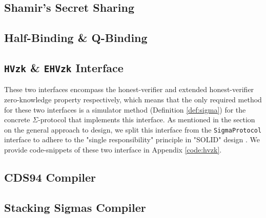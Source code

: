 \subsection{Shamir's Secret Sharing}\label{design:sss}


\subsection{Half-Binding \& Q-Binding}\label{design:qbinding}


\subsection{\texttt{HVzk} \& \texttt{EHVzk} Interface}
These two interfaces encompass the honest-verifier and extended honest-verifier zero-knowledge 
property respectively, which means that the only required method for these two interfaces 
is a simulator method (Definition \ref{def:sigma}) for the concrete $\Sigma$-protocol that 
implements this interface. As mentioned in the section on the general approach to design, 
we split this interface from the \texttt{SigmaProtocol} interface to adhere to the 
"single responsibility" principle in "SOLID" design \cite{martin2000design}. We provide 
code-snippets of these two interface in Appendix \ref{code:hvzk}.

\subsection{CDS94 Compiler}\label{design:cds94}

\subsection{Stacking Sigmas Compiler}\label{design:stacking}








